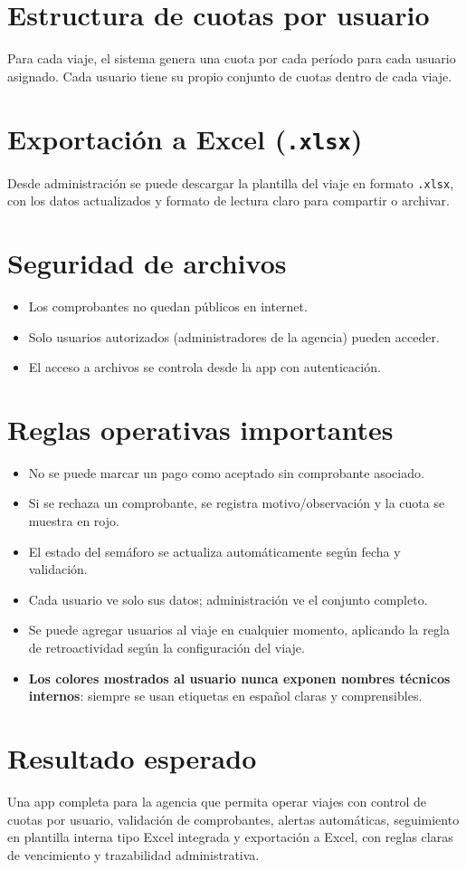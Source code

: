 \documentclass[12pt,a4paper]{article}
\begin{document}
\section{Estructura de cuotas por usuario}
Para cada viaje, el sistema genera una cuota por cada período para cada usuario asignado.
Cada usuario tiene su propio conjunto de cuotas dentro de cada viaje.

\section{Exportación a Excel (\texttt{.xlsx})}
Desde administración se puede descargar la plantilla del viaje en formato \texttt{.xlsx}, con los datos actualizados y formato de lectura claro para compartir o archivar.

\section{Seguridad de archivos}
\begin{itemize}[leftmargin=*]
    \item Los comprobantes no quedan públicos en internet.
    \item Solo usuarios autorizados (administradores de la agencia) pueden acceder.
    \item El acceso a archivos se controla desde la app con autenticación.
\end{itemize}

\section{Reglas operativas importantes}
\begin{itemize}[leftmargin=*]
    \item No se puede marcar un pago como aceptado sin comprobante asociado.
    \item Si se rechaza un comprobante, se registra motivo/observación y la cuota se muestra en rojo.
    \item El estado del semáforo se actualiza automáticamente según fecha y validación.
    \item Cada usuario ve solo sus datos; administración ve el conjunto completo.
    \item Se puede agregar usuarios al viaje en cualquier momento, aplicando la regla de retroactividad según la configuración del viaje.
    \item \textbf{Los colores mostrados al usuario nunca exponen nombres técnicos internos}: siempre se usan etiquetas en español claras y comprensibles.
\end{itemize}

\section{Resultado esperado}
Una app completa para la agencia que permita operar viajes con control de cuotas por usuario, validación de comprobantes, alertas automáticas, seguimiento en plantilla interna tipo Excel integrada y exportación a Excel, con reglas claras de vencimiento y trazabilidad administrativa.
\end{document}
